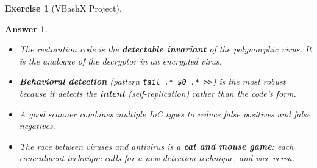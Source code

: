 \documentclass[a4paper,11pt]{article}
\theoremstyle{plain}
\newtheorem{correction}{Answer}
\theoremstyle{definition}
\newtheorem{exercice}{Exercise}
\begin{document}
\begin{exercice}[VBashX Project]
\begin{correction}
\begin{pointcle}
\begin{itemize}
    \item The restoration code is the \textbf{detectable invariant} of the polymorphic virus. It is the analogue of the \textit{decryptor} in an encrypted virus.
    \item \textbf{Behavioral detection} (pattern \texttt{tail .* \$0 .* >>}) is the most robust because it detects the \textbf{intent} (self-replication) rather than the code's form.
    \item A good scanner combines multiple IoC types to reduce false positives and false negatives.
    \item The race between viruses and antivirus is a \textbf{cat and mouse game}: each concealment technique calls for a new detection technique, and vice versa.
\end{itemize}
\end{pointcle}

\end{correction}

\end{exercice}
\end{document}
